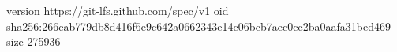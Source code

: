 version https://git-lfs.github.com/spec/v1
oid sha256:266cab779db8d416f6e9c642a0662343e14c06bcb7aec0ce2ba0aafa31bed469
size 275936
